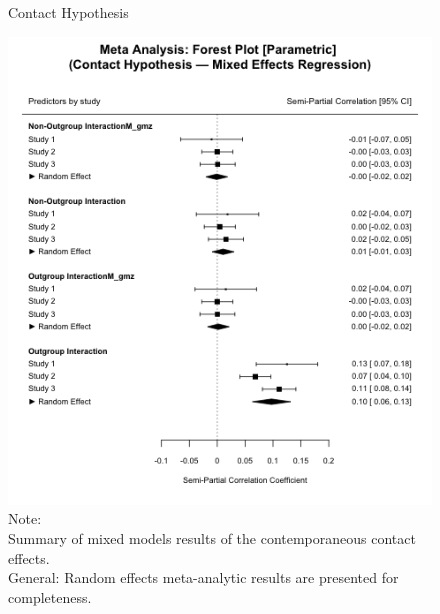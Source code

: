 \documentclass[man, 12pt, a4paper, mask]{apa7}
\theoremstyle{break}
\theoremstyle{plain}
\begin{document}
\begin{figure}
  \caption{Contact Hypothesis}
  \label{fig:ContactHypothesis}
  \centering\includegraphics[width=\textwidth]{Figures/forestParametricREMLGeneralLmer.png}
  \caption*{Note: \\
  Summary of mixed models results of the contemporaneous contact effects.\\
  General: Random effects meta-analytic results are presented for completeness.}
\end{figure}
\end{document}
